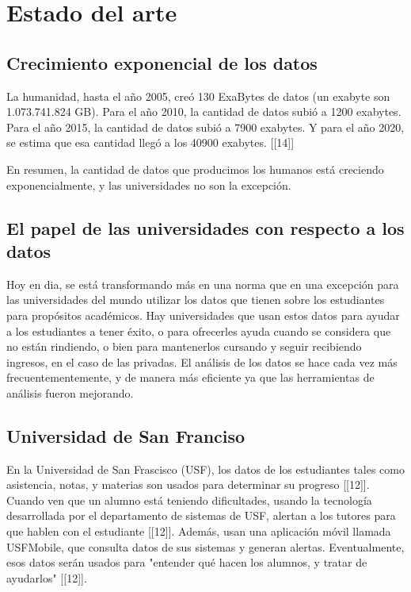 \chapter{Estado del arte}
\label{sec:hello}

\section[Crecimiento exponencial de los datos]{Crecimiento exponencial de los datos} 


La humanidad, hasta el año 2005, creó 130 ExaBytes de datos (un exabyte son 1.073.741.824 GB). Para el año 2010, la cantidad de datos subió a 1200 exabytes. Para el año 2015, la cantidad de datos subió a 7900 exabytes. Y para el año 2020, se estima que esa cantidad llegó a los 40900 exabytes. [[14]]

En resumen, la cantidad de datos que producimos los humanos está creciendo exponencialmente, y las universidades no son la excepción.



\section[El papel de las universidades con respecto a los datos]{El papel de las universidades con respecto a los datos}

Hoy en dia, se está transformando más en una norma que en una excepción para las universidades del mundo utilizar los datos que tienen sobre los estudiantes para propósitos académicos. Hay universidades que usan estos datos para ayudar a los estudiantes a tener éxito, o para ofrecerles ayuda cuando se considera que no están rindiendo, o bien para mantenerlos cursando y seguir recibiendo ingresos, en el caso de las privadas.
El análisis de los datos se hace cada vez más frecuentementemente, y de manera más eficiente ya que las herramientas de análisis fueron mejorando.

\section[Universidad de San Franciso]{Universidad de San Franciso}

En la Universidad de San Frascisco (USF), los datos de los estudiantes tales como asistencia, notas, y materias son usados para determinar su progreso [[12]]. Cuando ven que un alumno está teniendo dificultades, usando la tecnología desarrollada por el departamento de sistemas de USF, alertan a los tutores para que hablen con el estudiante [[12]].
Además, usan una aplicación móvil llamada USFMobile, que consulta datos de sus sistemas y generan alertas.
Eventualmente, esos datos serán usados para "entender qué hacen los alumnos, y tratar de ayudarlos" [[12]].

